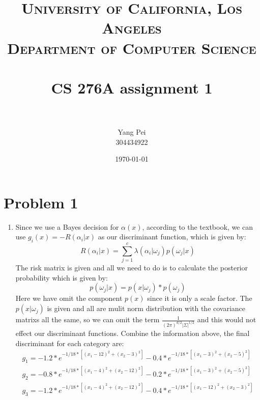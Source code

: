 \documentclass[paper=a4, fontsize=11pt]{scrartcl} %
\title{	
\normalfont \normalsize 
\textsc{University of California, Los Angeles\\
Department of Computer Science} \\ [25pt] %
\horrule{0.5pt} \\[0.4cm] %
\huge CS 276A assignment 1 \\ %
\horrule{2pt} \\[0.5cm] %
}
\author{Yang Pei\\
304434922} %
\date{\normalsize\today} %
\numberwithin{equation}{section} %
\numberwithin{figure}{section} %
\numberwithin{table}{section} %
\begin{document}
\maketitle %


\section{Problem 1}

\begin{enumerate}
\item Since we use a Bayes decision for $\alpha(x)$, according to the textbook, we can use $g_{i}(x) = -R(\alpha_{i}|x)$ as our discriminant function, which is given by:
\begin{equation}
R(\alpha_{i}|x) = \sum_{j=1}^{c}\lambda(\alpha_{i}|\omega_{j})p(\omega_{j}|x)
\end{equation}
The risk matrix is given and all we need to do is to calculate the posterior probability which is given by:
\begin{equation}
p(\omega_{j}|x) = p(x|\omega_{j})*p(\omega_{j})
\end{equation}
Here we have omit the component $p(x)$ since it is only a scale factor. The $p(x|\omega_{j})$ is given and all are mulit norm distribution with the covariance matrixs all the same, so we can omit the term $\frac{1}{(2\pi)^{d/2}|\Sigma|^{1/2}}$ and this would not effect our discriminant functions. Combine the information above, the final discriminant for each category are:
\begin{equation}
\begin{aligned}
g_{1} = -1.2*e^{-1/18*[(x_{1} - 12)^{2}+(x_{2} - 3)^{2}]} -0.4*e^{-1/18*[(x_{1} - 3)^{2}+(x_{2} - 5)^{2}]}\\
g_{2} = -0.8*e^{-1/18*[(x_{1} - 4)^{2}+(x_{2} - 12)^{2}]} -0.2*e^{-1/18*[(x_{1} - 3)^{2}+(x_{2} - 5)^{2}]}\\
g_{3} = -1.2*e^{-1/18*[(x_{1} - 4)^{2}+(x_{2} - 12)^{2}]} -0.4*e^{-1/18*[(x_{1} - 12)^{2}+(x_{2} - 3)^{2}]}
\end{aligned}
\end{equation}


\end{enumerate}
\end{document}
